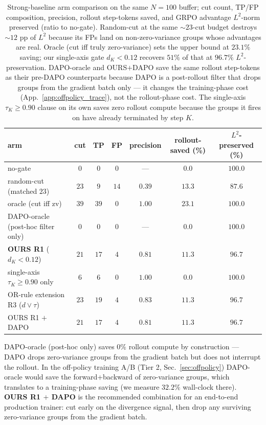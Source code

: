 \documentclass{article}
\begin{document}
\begin{table}[h]
\centering
\caption{Strong-baseline arm comparison on the same $N\!=\!100$
buffer; cut count, TP/FP composition, precision, rollout
step-tokens saved, and GRPO advantage $L^2$-norm preserved
(ratio to no-gate). Random-cut at the same $\sim\!23$-cut budget
destroys $\sim\!12$ pp of $L^2$ because its FPs land on
non-zero-variance groups whose advantages are real. Oracle (cut
iff truly zero-variance) sets the upper bound at $23.1\%$
saving; our single-axis gate $d_K\!<\!0.12$ recovers $51\%$ of
that at $96.7\%$ $L^2$-preservation. DAPO-oracle and
OURS$+$DAPO save the same rollout step-tokens as their
pre-DAPO counterparts because DAPO is a post-rollout filter
that drops groups from the gradient batch only --- it changes
the training-phase cost (App.~\ref{app:offpolicy_trace}), not
the rollout-phase cost. The single-axis $\tau_K \ge 0.90$ clause
on its own saves zero rollout compute because the groups it
fires on have already terminated by step $K$.}
\label{tab:strong_baselines_app}
\small
\begin{tabular}{lcccccc}
\toprule
arm & cut & TP & FP & precision & rollout-saved (\%) & $L^2$-preserved (\%) \\
\midrule
no-gate                                 & $0$  & $0$  & $0$  & ---    & $0.0$  & $100.0$ \\
random-cut (matched $23$)               & $23$ & $9$  & $14$ & $0.39$ & $13.3$ & $87.6$ \\
oracle (cut iff zv)                     & $39$ & $39$ & $0$  & $1.00$ & $\mathbf{23.1}$ & $100.0$ \\
DAPO-oracle (post-hoc filter only)      & $0$  & $0$  & $0$  & ---    & $0.0$  & $100.0$ \\
\textbf{OURS R1} ($d_K\!<\!0.12$)        & $21$ & $17$ & $4$  & $0.81$ & $\mathbf{11.3}$ & $\mathbf{96.7}$ \\
single-axis $\tau_K\!\ge\!0.90$ only    & $6$  & $6$  & $0$  & $1.00$ & $0.0$  & $100.0$ \\
OR-rule extension R3 ($d\!\lor\!\tau$)  & $23$ & $19$ & $4$  & $0.83$ & $11.3$ & $96.7$ \\
OURS R1 $+$ DAPO                        & $21$ & $17$ & $4$  & $0.81$ & $11.3$ & $96.7$ \\
\bottomrule
\end{tabular}
\end{table}

DAPO-oracle (post-hoc only) saves $0\%$ rollout compute by
construction — DAPO drops zero-variance groups from the gradient
batch but does not interrupt the rollout. In the off-policy training
A/B (Tier 2, Sec.~\ref{sec:offpolicy}) DAPO-oracle would save the
forward+backward of zero-variance groups, which translates to a
training-phase saving (we measure $32.2\%$ wall-clock there).
\textbf{OURS R1 $+$ DAPO} is the recommended combination for an
end-to-end production trainer: cut early on the divergence signal,
then drop any surviving zero-variance groups from the gradient batch.
\end{document}

